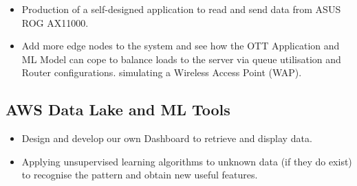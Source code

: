 \begin{itemize}
  \item Production of a self-designed application to read and send data from ASUS ROG AX11000.
  \item Add more edge nodes to the system and see how the OTT Application and ML Model can cope to
balance loads to the server via queue utilisation and Router configurations. simulating a Wireless Access Point (WAP).
\end{itemize}

\subsection{AWS Data Lake and ML Tools}

\begin{itemize}
  \item Design and develop our own Dashboard to retrieve and display data.
  \item Applying unsupervised learning algorithms to unknown data (if they do exist) to recognise the pattern and obtain new useful features.
\end{itemize}